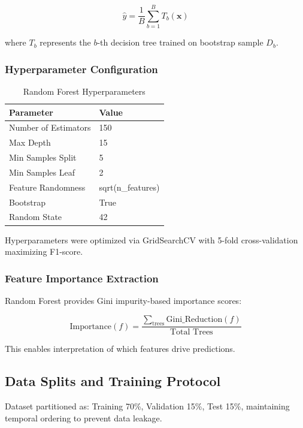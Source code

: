 \documentclass[conference]{IEEEtran}
\begin{document}
\begin{equation}
\hat{y} = \frac{1}{B} \sum_{b=1}^{B} T_b(\mathbf{x})
\end{equation}

where $T_b$ represents the $b$-th decision tree trained on bootstrap sample $D_b$.

\subsubsection{Hyperparameter Configuration}

\begin{table}[!h]
\centering
\begin{tabular}{ll}
\toprule
\textbf{Parameter} & \textbf{Value} \\
\midrule
Number of Estimators & 150 \\
Max Depth & 15 \\
Min Samples Split & 5 \\
Min Samples Leaf & 2 \\
Feature Randomness & sqrt(n\_features) \\
Bootstrap & True \\
Random State & 42 \\
\bottomrule
\end{tabular}
\caption{Random Forest Hyperparameters}
\label{tab:hparams}
\end{table}

Hyperparameters were optimized via GridSearchCV with 5-fold cross-validation maximizing F1-score.

\subsubsection{Feature Importance Extraction}

Random Forest provides Gini impurity-based importance scores:

\begin{equation}
\text{Importance}(f) = \frac{\sum_{\text{trees}} \text{Gini\_Reduction}(f)}{\text{Total Trees}}
\end{equation}

This enables interpretation of which features drive predictions.

\subsection{Data Splits and Training Protocol}

Dataset partitioned as: Training 70\%, Validation 15\%, Test 15\%, maintaining temporal ordering to prevent data leakage.
\end{document}
